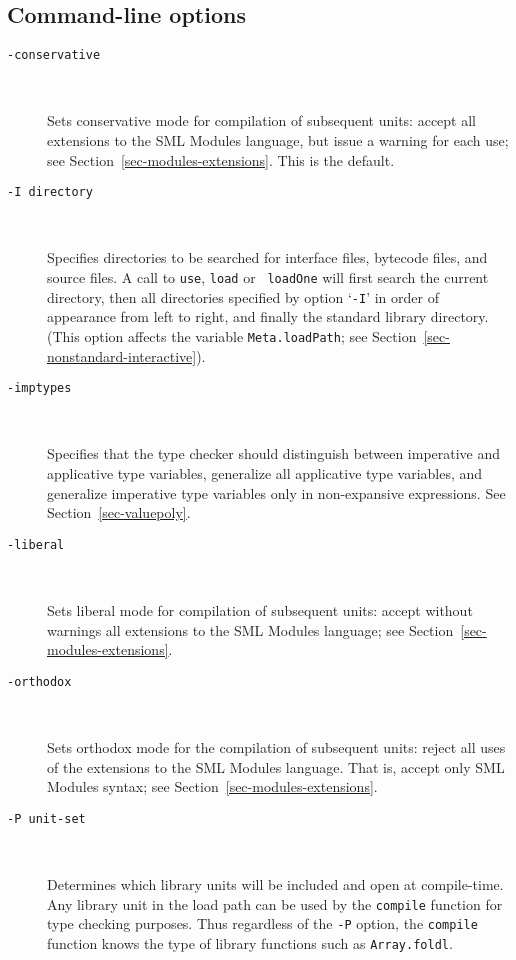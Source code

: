\documentclass[fleqn]{article}
\begin{document}
\subsection{Command-line options}
\label{sec-mosml-options}

\begin{description}
\item[{\tt -conservative}]\mbox{ }
  
  Sets conservative mode for compilation of subsequent units: accept
  all extensions to the SML Modules language, but issue a warning for
  each use; see Section~\ref{sec-modules-extensions}.  This is the
  default.

\item[{\tt -I {\rm directory}}]\mbox{ }

  Specifies directories to be searched for interface files, bytecode
  files, and source files.  A call to {\tt use}, {\tt load} or {\tt
    loadOne} will first search the current directory, then all
  directories specified by option `{\tt -I}' in order of appearance
  from left to right, and finally the standard library directory.
  (This option affects the variable {\tt Meta.loadPath}; see
  Section~\ref{sec-nonstandard-interactive}).

\item[{\tt -imptypes}]\mbox{ }

  Specifies that the type checker should distinguish between
  imperative and applicative type variables, generalize all
  applicative type variables, and generalize imperative type variables
  only in non-expansive expressions.  See Section~\ref{sec-valuepoly}.

\item[{\tt -liberal}]\mbox{ }
  
  Sets liberal mode for compilation of subsequent units: accept
  without warnings all extensions to the SML Modules language; see
  Section~\ref{sec-modules-extensions}.

\item[{\tt -orthodox}]\mbox{ }
  
  Sets orthodox mode for the compilation of subsequent units: reject
  all uses of the extensions to the SML Modules language.  That is,
  accept only SML Modules syntax; see
  Section~\ref{sec-modules-extensions}.

\item[{\tt -P {\rm unit-set}}]\mbox{ }

  Determines which library units will be included and open at
  compile-time.  Any library unit in the load path can be used by the
  {\tt compile} function for type checking purposes.  Thus regardless
  of the {\tt -P} option, the {\tt compile} function knows the type of
  library functions such as {\tt Array.foldl}.


\end{description}
\end{document}
